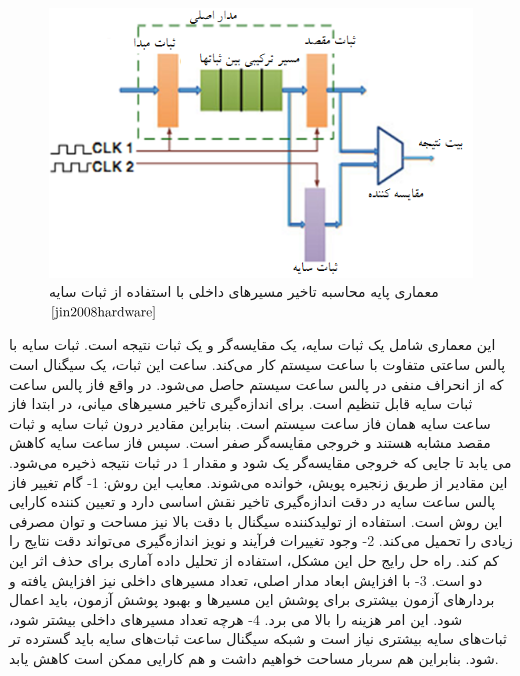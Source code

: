 \begin{figure}
	\begin{center}
		\includegraphics[scale=1]{figs/fig1-5.png}
		\caption[معماری پایه محاسبه تاخیر مسیرهای داخلی با استفاده از ثبات سایه]
		{معماری پایه محاسبه تاخیر مسیرهای داخلی با استفاده از ثبات سایه $\cite{jin2008hardware}$}
		\label{fig1-5}
	\end{center}
\end{figure} 
این معماری شامل یک ثبات سایه، یک مقایسه‌گر و یک ثبات نتیجه است. ثبات سایه با پالس ساعتی متفاوت با ساعت سیستم کار می‌کند. ساعت این ثبات، یک سیگنال است که از انحراف منفی در پالس ساعت سیستم حاصل می‌شود. در واقع فاز پالس ساعت ثبات سایه قابل تنظیم است. برای اندازه‌گیری تاخیر مسیرهای میانی، در ابتدا فاز ساعت سایه همان فاز ساعت سیستم است. بنابراین مقادیر درون ثبات سایه و ثبات مقصد مشابه هستند و خروجی مقایسه‌گر صفر است. سپس فاز ساعت سایه کاهش می یابد تا جایی که خروجی مقایسه‌گر یک شود و مقدار 1 در ثبات نتیجه ذخیره می‌شود. این مقادیر از طریق زنجیره پویش، خوانده می‌شوند.
معایب این روش:
1- گام تغییر فاز پالس ساعت سایه در دقت اندازه‌گیری تاخیر نقش اساسی دارد و تعیین کننده کارایی این روش است. استفاده از تولیدکننده سیگنال با دقت بالا نیز مساحت و توان مصرفی زیادی را تحمیل می‌کند.
2- وجود تغییرات فرآیند و نویز اندازه‌گیری می‌تواند دقت نتایج را کم کند. راه حل رایج حل این مشکل، استفاده از تحلیل داده آماری برای حذف اثر این دو است.
3- با افزایش ابعاد مدار اصلی، تعداد مسیرهای داخلی نیز افزایش یافته و بردارهای آزمون بیشتری برای پوشش این مسیرها و بهبود پوشش آزمون، باید اعمال شود. این امر هزینه را بالا می برد. 
4- هرچه تعداد مسیرهای داخلی بیشتر شود، ثبات‌های سایه بیشتری نیاز است و شبکه سیگنال ساعت ثبات‌های سایه باید گسترده تر شود. بنابراین هم سربار مساحت خواهیم داشت و هم کارایی ممکن است کاهش یابد.

